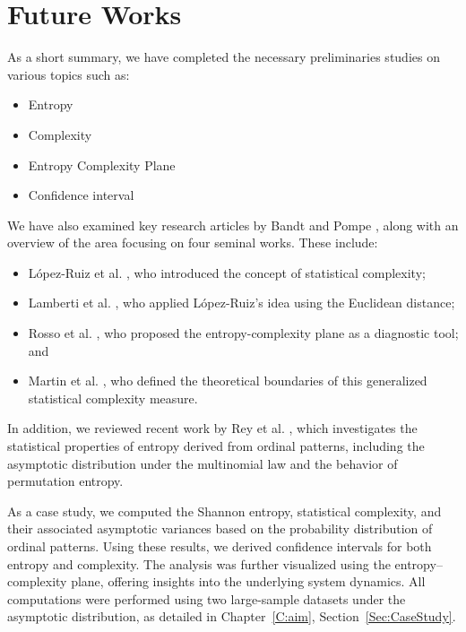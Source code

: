 \chapter{Future Works}\label{C:futw}

As a short summary, we have completed the necessary preliminaries studies on various topics such as:
\begin{itemize}
    \item Entropy
    \item Complexity
    \item Entropy Complexity Plane
    \item Confidence interval
\end{itemize}

We have also examined key research articles by Bandt and Pompe \cite{PhysRevLett.88.174102}, along with an overview of the area focusing on four seminal works. These include:
\begin{itemize}
	\item López-Ruiz et al. \cite{lopez1995statistical}, who introduced the concept of statistical complexity;
	\item Lamberti et al. \cite{lamberti2004intensive}, who applied López-Ruiz's idea using the Euclidean distance;
	\item Rosso et al. \cite{EEGAnalysisUsingWaveletBasedInformationTools}, who proposed the entropy-complexity plane as a diagnostic tool; and
	\item Martin et al. \cite{Martin2006}, who defined the theoretical boundaries of this generalized statistical complexity measure.
\end{itemize}

In addition, we reviewed recent work by Rey et al. \cite{Rey2025,Rey2023a,Rey2023}, which investigates the statistical properties of entropy derived from ordinal patterns, including the asymptotic distribution under the multinomial law and the behavior of permutation entropy. 

As a case study, we computed the Shannon entropy, statistical complexity, and their associated asymptotic variances based on the probability distribution of ordinal patterns. Using these results, we derived confidence intervals for both entropy and complexity. The analysis was further visualized using the entropy–complexity plane, offering insights into the underlying system dynamics. All computations were performed using two large-sample datasets under the asymptotic distribution, as detailed in Chapter~\ref{C:aim}, Section~\ref{Sec:CaseStudy}. 


